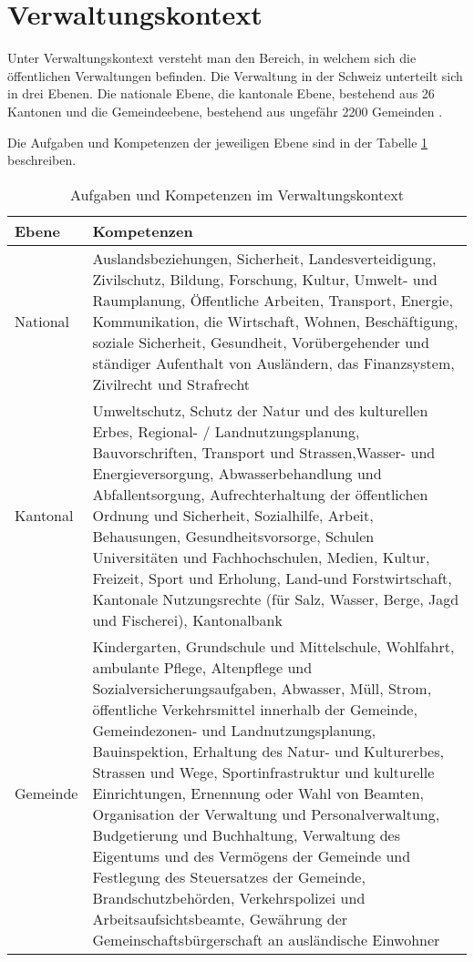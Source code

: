 \section{Verwaltungskontext}

Unter Verwaltungskontext versteht man den Bereich, in welchem sich die öffentlichen Verwaltungen befinden. Die Verwaltung in der Schweiz unterteilt sich in drei Ebenen. Die nationale Ebene, die kantonale Ebene, bestehend aus 26 Kantonen und die Gemeindeebene, bestehend aus ungefähr 2200 Gemeinden \parencite[S. 26-30]{HANDBOEFFVER}.

Die Aufgaben und Kompetenzen der jeweiligen Ebene sind in der Tabelle \ref{tab:aufgabenverwaltungsk} beschreiben. 
\newpage
\begin{table}[h]
	\centering
\begin{tabular}{|p{2.5cm}|p{11.5cm}|}
  \hline
  \textbf{Ebene} & \textbf{Kompetenzen} \\ \hline
   National & Auslandsbeziehungen, Sicherheit, Landesverteidigung, Zivilschutz, Bildung, Forschung, Kultur, Umwelt- und Raumplanung, Öffentliche Arbeiten, Transport, Energie, Kommunikation, die Wirtschaft, Wohnen, Beschäftigung, soziale Sicherheit, Gesundheit, Vorübergehender und ständiger Aufenthalt von Ausländern, das Finanzsystem, Zivilrecht und Strafrecht \\ \hline
   Kantonal & Umweltschutz, Schutz der Natur und des kulturellen Erbes, Regional- / Landnutzungsplanung, Bauvorschriften, Transport und Strassen,Wasser- und Energieversorgung, Abwasserbehandlung und Abfallentsorgung, Aufrechterhaltung der öffentlichen Ordnung und Sicherheit, Sozialhilfe, Arbeit, Behausungen, Gesundheitsvorsorge, Schulen Universitäten und Fachhochschulen, Medien, Kultur, Freizeit, Sport und Erholung, Land-und Forstwirtschaft, Kantonale Nutzungsrechte (für Salz, Wasser, Berge, Jagd und Fischerei), Kantonalbank\\ \hline
   Gemeinde & Kindergarten, Grundschule und Mittelschule, Wohlfahrt, ambulante Pflege, Altenpflege und Sozialversicherungsaufgaben, Abwasser, Müll, Strom, öffentliche Verkehrsmittel innerhalb der Gemeinde, Gemeindezonen- und Landnutzungsplanung, Bauinspektion, Erhaltung des Natur- und Kulturerbes, Strassen und Wege, Sportinfrastruktur und kulturelle Einrichtungen, Ernennung oder Wahl von Beamten, Organisation der Verwaltung und Personalverwaltung, Budgetierung und Buchhaltung, Verwaltung des Eigentums und des Vermögens der Gemeinde und Festlegung des Steuersatzes der Gemeinde, Brandschutzbehörden, Verkehrspolizei und Arbeitsaufsichtsbeamte, Gewährung der Gemeinschaftsbürgerschaft an ausländische Einwohner \\ \hline
  \end{tabular} 
	\caption{Aufgaben und Kompetenzen im Verwaltungskontext \parencite[S. 26-30]{HANDBOEFFVER}}
	\label{tab:aufgabenverwaltungsk}
\end{table}


